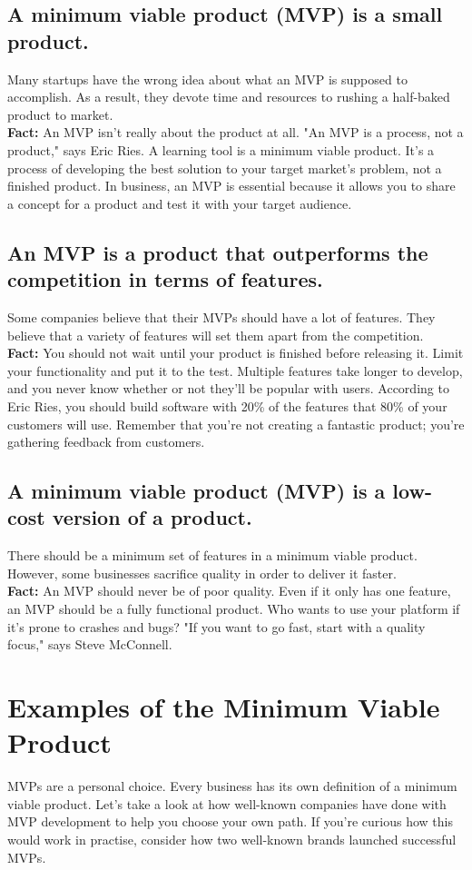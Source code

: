 \documentclass[paper=a4, fontsize=11pt]{scrartcl}
\numberwithin{equation}{section}		%
\numberwithin{figure}{section}			%
\numberwithin{table}{section}				%
\begin{document}
\subsection{A minimum viable product (MVP) is a small product.}
Many startups have the wrong idea about what an MVP is supposed to accomplish. As a result, they devote time and resources to rushing a half-baked product to market.\\
\textbf{Fact:} An MVP isn't really about the product at all. "An MVP is a process, not a product," says Eric Ries. A learning tool is a minimum viable product. It's a process of developing the best solution to your target market's problem, not a finished product. In business, an MVP is essential because it allows you to share a concept for a product and test it with your target audience.
\subsection{An MVP is a product that outperforms the competition in terms of features.}
Some companies believe that their MVPs should have a lot of features. They believe that a variety of features will set them apart from the competition.
\\
\textbf{Fact:} You should not wait until your product is finished before releasing it. Limit your functionality and put it to the test. Multiple features take longer to develop, and you never know whether or not they'll be popular with users. According to Eric Ries, you should build software with 20\% of the features that 80\% of your customers will use. Remember that you're not creating a fantastic product; you're gathering feedback from customers.
\subsection{A minimum viable product (MVP) is a low-cost version of a product.}
There should be a minimum set of features in a minimum viable product. However, some businesses sacrifice quality in order to deliver it faster.\\
\textbf{Fact:} An MVP should never be of poor quality. Even if it only has one feature, an MVP should be a fully functional product. Who wants to use your platform if it's prone to crashes and bugs? "If you want to go fast, start with a quality focus," says Steve McConnell.
\pagebreak
\section{Examples of the Minimum Viable Product}
MVPs are a personal choice. Every business has its own definition of a minimum viable product. Let's take a look at how well-known companies have done with MVP development to help you choose your own path. If you're curious how this would work in practise, consider how two well-known brands launched successful MVPs.
\end{document}
